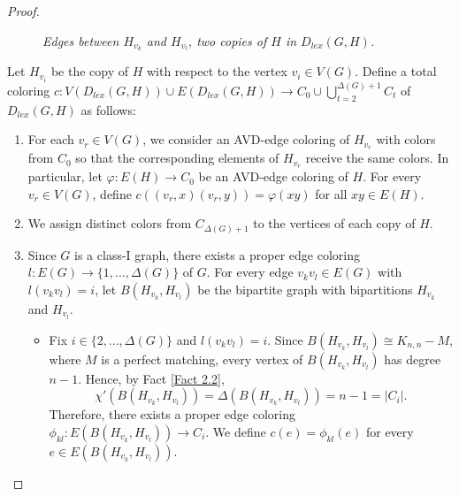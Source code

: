 \documentclass[12pt,reqno,a4paper]{amsart}
\theoremstyle{definition}
\theoremstyle{plain}
\begin{document}
\begin{proof}
\begin{figure}[htbp]
    \caption{\em Edges between $H_{v_k}$ and $H_{v_{l}}$, two copies of $H$ in $D_{lex}(G,H)$.}
    \label{Figure 2}
\end{figure}

Let $H_{v_i}$ be the copy of $H$ with respect to the vertex $v_i\in V(G)$.
Define a total coloring $c:V(D_{lex}(G, H))\cup E(D_{lex}(G, H))\rightarrow 
C_0\cup \bigcup_{t=2}^{\Delta(G)+1} C_t$ of $D_{lex}(G, H)$ as follows:
\begin{enumerate}
    \item For each $v_r\in V(G)$, we consider an AVD-edge coloring of $H_{v_r}$ with colors from $C_0$ so that the corresponding elements of $H_{v_r}$ receive the same colors. In particular, let
$
\varphi:E(H)\rightarrow C_0
$
be an AVD-edge coloring of \(H\). For every \(v_r\in V(G)\), define
$c((v_r,x)(v_r,y))=\varphi(xy)$ for all $xy\in E(H)$.    

\item We assign distinct colors from $C_{\Delta(G)+1}$ to the vertices of each
copy of $H$.


    \item Since $G$ is a class-I graph, there exists a proper edge coloring $l:E(G)\rightarrow \{1,...,\Delta(G)\}$ of $G$. For every edge $v_kv_l\in E(G)$ with $l(v_kv_l)=i$, let
$B(H_{v_k},H_{v_l})$ be the bipartite graph with bipartitions
$H_{v_k}$ and $H_{v_l}$.

    \begin{itemize}    
        \item Fix $i\in \{2,...,\Delta(G)\}$ and $l(v_kv_l)=i$.
     Since
$B(H_{v_k},H_{v_l})\cong K_{n,n}-M$, where $M$ is a perfect matching,
every vertex of $B(H_{v_k},H_{v_l})$ has degree $n-1$. Hence, by
Fact \ref{Fact 2.2},
\[
\chi'(B(H_{v_k},H_{v_l}))
=
\Delta(B(H_{v_k},H_{v_l}))
=
n-1
=
|C_i|.
\]
Therefore, there exists a proper edge coloring
$
\phi_{kl}:E(B(H_{v_k},H_{v_l}))\rightarrow C_i
$.
We define $c(e)=\phi_{kl}(e)$ for every $e\in E(B(H_{v_k},H_{v_l}))$.


\end{itemize}
\end{enumerate}
\end{proof}
\end{document}
